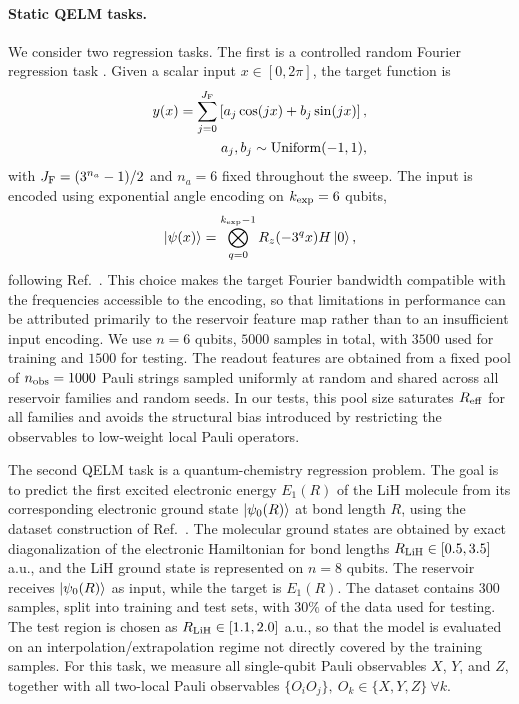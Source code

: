 \documentclass[
    aps,
    pre,
    amsmath,
    amssymb,
    reprint,
    superscriptaddress,
    preprintnumbers,
]{revtex4-2}
\begin{document}
\paragraph{Static QELM tasks.}
We consider two regression tasks. The first is a controlled random Fourier regression task \cite{xiong2024fundamental}. Given a scalar input $x\in[0,2\pi]$, the target function is
\begin{eqnarray}
    y(x)
=
\sum_{j=0}^{J_{\rm F}}
\left[
a_j \cos(jx) + b_j \sin(jx)
\right], \\ \nonumber
a_j,b_j\sim \mathrm{Uniform}(-1,1),
\label{eq:fourier-task}
\end{eqnarray}
%
with $J_{\rm F}=(3^{n_a}-1)/2$ and $n_a=6$ fixed throughout the sweep. The input is encoded using exponential angle encoding on $k_{\rm exp}=6$ qubits,
\begin{equation}
\ket{\psi(x)}
=
\bigotimes_{q=0}^{k_{\rm exp}-1}
R_z(-3^q x)H\ket{0},
\label{eq:exp-encoding}
\end{equation}
following Ref.~\cite{xiong2024fundamental}. This choice makes the target Fourier bandwidth compatible with the frequencies accessible to the encoding, so that limitations in performance can be attributed primarily to the reservoir feature map rather than to an insufficient input encoding. We use $n=6$ qubits, $5000$ samples in total, with $3500$ used for training and $1500$ for testing. The readout features are obtained from a fixed pool of $n_{\rm obs}=1000$ Pauli strings sampled uniformly at random and shared across all reservoir families and random seeds. In our tests, this pool size saturates $R_{\rm eff}$ for all families and avoids the structural bias introduced by restricting the observables to low-weight local Pauli operators.

The second QELM task is a quantum-chemistry regression problem. The goal is to predict the first excited electronic energy $E_1(R)$ of the LiH molecule from its corresponding electronic ground state $\ket{\psi_0(R)}$ at bond length $R$, using the dataset construction of Ref.~\cite{domingo2022optimal}. The molecular ground states are obtained by exact diagonalization of the electronic Hamiltonian for bond lengths $R_{\rm LiH}\in[0.5,3.5]$ a.u., and the LiH ground state is represented on $n=8$ qubits. The reservoir receives $\ket{\psi_0(R)}$ as input, while the target is $E_1(R)$. The dataset contains $300$ samples, split into training and test sets, with $30\%$ of the data used for testing. The test region is chosen as $R_{\rm LiH}\in[1.1,2.0]$ a.u., so that the model is evaluated on an interpolation/extrapolation regime not directly covered by the training samples. For this task, we measure all single-qubit Pauli observables $X$, $Y$, and $Z$, together with all two-local Pauli observables $\{O_iO_j\}, \ O_k \in \{X, Y, Z\} \ \forall k$.
\end{document}
